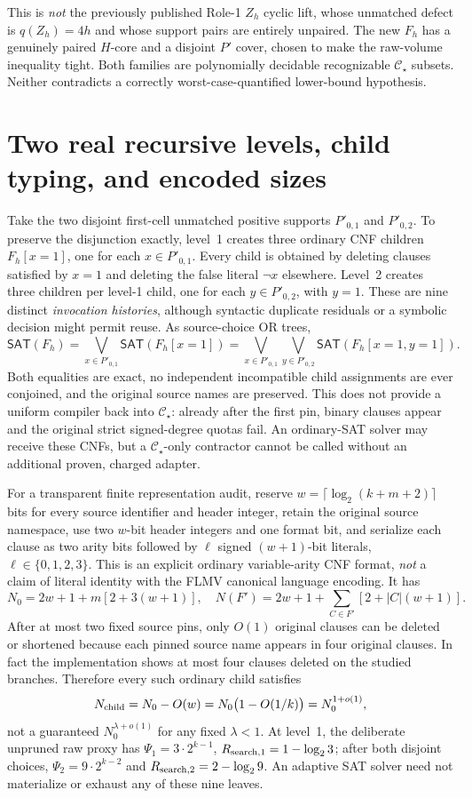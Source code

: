 \documentclass[11pt]{article}
\newcommand{\CS}{\mathcal C_\star}
\newcommand{\SAT}{\mathsf{SAT}}
\begin{document}
This is \emph{not} the previously published Role-1 \(Z_h\) cyclic lift, whose unmatched defect is \(q(Z_h)=4h\) and whose support pairs are entirely unpaired. The new \(F_h\) has a genuinely paired \(H\)-core and a disjoint \(P'\) cover, chosen to make the raw-volume inequality tight. Both families are polynomially decidable recognizable \(\CS\) subsets. Neither contradicts a correctly worst-case-quantified lower-bound hypothesis.

\section{Two real recursive levels, child typing, and encoded sizes}
Take the two disjoint first-cell unmatched positive supports \(P'_{0,1}\) and \(P'_{0,2}\). To preserve the disjunction exactly, level~1 creates three ordinary CNF children \(F_h[x=1]\), one for each \(x\in P'_{0,1}\). Every child is obtained by deleting clauses satisfied by \(x=1\) and deleting the false literal \(\neg x\) elsewhere. Level~2 creates three children per level-1 child, one for each \(y\in P'_{0,2}\), with \(y=1\). These are nine distinct \emph{invocation histories}, although syntactic duplicate residuals or a symbolic decision might permit reuse. As source-choice OR trees,
\[
\SAT(F_h)=\bigvee_{x\in P'_{0,1}}\SAT(F_h[x=1])
=\bigvee_{x\in P'_{0,1}}\bigvee_{y\in P'_{0,2}}\SAT(F_h[x=1,y=1]).
\]
Both equalities are exact, no independent incompatible child assignments are ever conjoined, and the original source names are preserved. This does not provide a uniform compiler back into \(\CS\): already after the first pin, binary clauses appear and the original strict signed-degree quotas fail. An ordinary-SAT solver may receive these CNFs, but a \(\CS\)-only contractor cannot be called without an additional proven, charged adapter.

For a transparent finite representation audit, reserve \(w=\lceil\log_2(k+m+2)\rceil\) bits for every source identifier and header integer, retain the original source namespace, use two \(w\)-bit header integers and one format bit, and serialize each clause as two arity bits followed by \(\ell\) signed \((w+1)\)-bit literals, \(\ell\in\{0,1,2,3\}\). This is an explicit ordinary variable-arity CNF format, \emph{not} a claim of literal identity with the FLMV canonical language encoding. It has
\[
 N_0=2w+1+m[2+3(w+1)],\quad
 N(F')=2w+1+\sum_{C\in F'}[2+|C|(w+1)].
\]
After at most two fixed source pins, only \(O(1)\) original clauses can be deleted or shortened because each pinned source name appears in four original clauses. In fact the implementation shows at most four clauses deleted on the studied branches. Therefore every such ordinary child satisfies
\[
 N_{\rm child}=N_0-O(w)=N_0\bigl(1-O(1/k)\bigr)=N_0^{1+o(1)},
\]
not a guaranteed \(N_0^{\lambda+o(1)}\) for any fixed \(\lambda<1\). At level~1, the deliberate unpruned raw proxy has \(\Psi_1=3\cdot2^{k-1}\), \(R_{\rm search,1}=1-\log_2 3\); after both disjoint choices, \(\Psi_2=9\cdot2^{k-2}\) and \(R_{\rm search,2}=2-\log_2 9\). An adaptive SAT solver need not materialize or exhaust any of these nine leaves.
\end{document}

